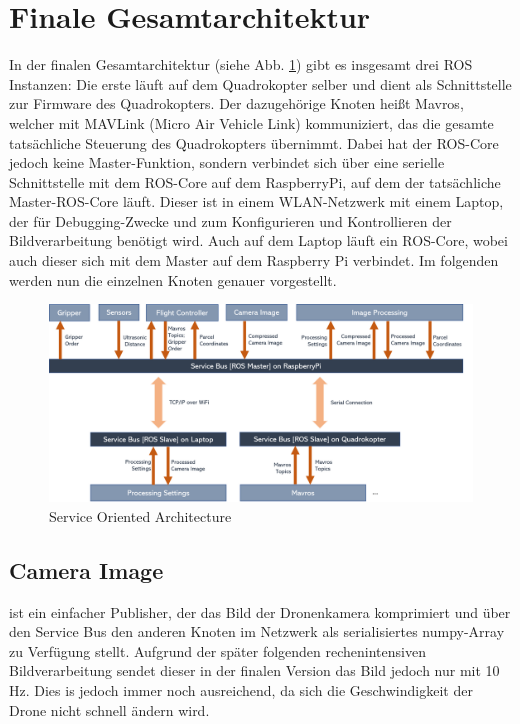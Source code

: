 \section{Finale Gesamtarchitektur}
In der finalen Gesamtarchitektur (siehe Abb. \ref{fig:gesamtarch}) gibt es insgesamt drei ROS Instanzen: Die erste läuft auf dem Quadrokopter selber und dient als Schnittstelle zur Firmware des Quadrokopters. Der dazugehörige Knoten heißt Mavros, welcher mit MAVLink (Micro Air Vehicle Link) kommuniziert, das die gesamte tatsächliche Steuerung des Quadrokopters übernimmt. Dabei hat der ROS-Core jedoch keine Master-Funktion, sondern verbindet sich über eine serielle Schnittstelle mit dem ROS-Core auf dem RaspberryPi, auf dem der tatsächliche Master-ROS-Core läuft. Dieser ist in einem WLAN-Netzwerk mit einem Laptop, der für Debugging-Zwecke und zum Konfigurieren und Kontrollieren der Bildverarbeitung benötigt wird. Auch auf dem Laptop läuft ein ROS-Core, wobei auch dieser sich mit dem Master auf dem Raspberry Pi verbindet. Im folgenden werden nun die einzelnen Knoten genauer vorgestellt.

\begin{figure}[h]
	\centering
	\includegraphics[scale=0.51]{"Grafiken/gesamtarchitektur.png"}
	\caption{Service Oriented Architecture}
	\label{fig:gesamtarch}
\end{figure}


\subsection{Camera Image} ist ein einfacher Publisher, der das Bild der Dronenkamera komprimiert und über den Service Bus den anderen Knoten im Netzwerk als serialisiertes numpy-Array zu Verfügung stellt. Aufgrund der später folgenden rechenintensiven Bildverarbeitung sendet dieser in der finalen Version das Bild jedoch nur mit 10 Hz. Dies is jedoch immer noch ausreichend, da sich die Geschwindigkeit der Drone nicht schnell ändern wird. 
